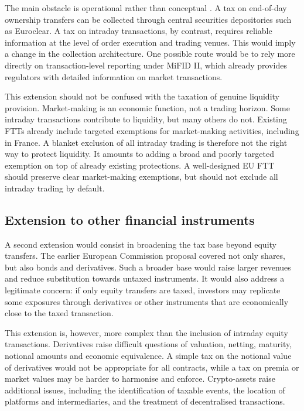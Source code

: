 \documentclass[../../main]{subfiles}
\begin{document}
The main obstacle is operational rather than conceptual \citep{CapelleBlancard2024FrenchFTT}. A tax on end-of-day ownership transfers can be collected through central securities depositories such as Euroclear. A tax on intraday transactions, by contrast, requires reliable information at the level of order execution and trading venues. This would imply a change in the collection architecture. One possible route would be to rely more directly on transaction-level reporting under MiFID II, which already provides regulators with detailed information on market transactions.

This extension should not be confused with the taxation of genuine liquidity provision. Market-making is an economic function, not a trading horizon. Some intraday transactions contribute to liquidity, but many others do not. Existing FTTs already include targeted exemptions for market-making activities, including in France. A blanket exclusion of all intraday trading is therefore not the right way to protect liquidity. It amounts to adding a broad and poorly targeted exemption on top of already existing protections. A well-designed EU FTT should preserve clear market-making exemptions, but should not exclude all intraday trading by default.

\subsection{Extension to other financial instruments}

A second extension would consist in broadening the tax base beyond equity transfers. The earlier European Commission proposal covered not only shares, but also bonds and derivatives. Such a broader base would raise larger revenues and reduce substitution towards untaxed instruments. It would also address a legitimate concern: if only equity transfers are taxed, investors may replicate some exposures through derivatives or other instruments that are economically close to the taxed transaction.

This extension is, however, more complex than the inclusion of intraday equity transactions. Derivatives raise difficult questions of valuation, netting, maturity, notional amounts and economic equivalence. A simple tax on the notional value of derivatives would not be appropriate for all contracts, while a tax on premia or market values may be harder to harmonise and enforce. Crypto-assets raise additional issues, including the identification of taxable events, the location of platforms and intermediaries, and the treatment of decentralised transactions.
\end{document}
